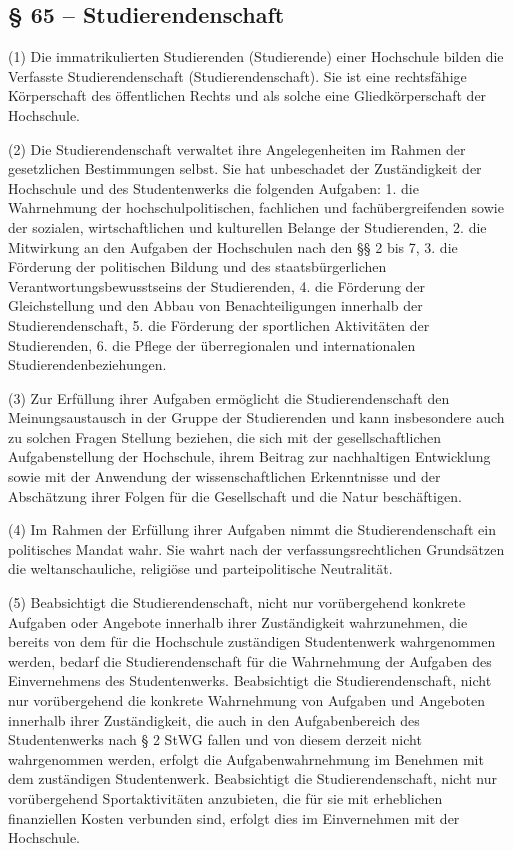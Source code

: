 \documentclass[
10pt,
a4paper,
twoside,								%
titlepage=false,							%
draft=false								%
]{scrartcl}
\begin{document}
\subsection{§ 65 – Studierendenschaft}

(1) Die immatrikulierten Studierenden (Studierende) einer Hochschule bilden die Verfasste Studierendenschaft (Studierendenschaft). Sie ist eine rechtsfähige Körperschaft des öffentlichen Rechts und als solche eine Gliedkörperschaft der Hochschule.

(2) Die Studierendenschaft verwaltet ihre Angelegenheiten im Rahmen der gesetzlichen Bestimmungen selbst. Sie hat unbeschadet der Zuständigkeit der Hochschule und des Studentenwerks die folgenden Aufgaben:
1. die Wahrnehmung der hochschulpolitischen, fachlichen und fachübergreifenden sowie der sozialen, wirtschaftlichen und kulturellen Belange der Studierenden,
2. die Mitwirkung an den Aufgaben der Hochschulen nach den §§ 2 bis 7,
3. die Förderung der politischen Bildung und des staatsbürgerlichen Verantwortungsbewusstseins der Studierenden,
4. die Förderung der Gleichstellung und den Abbau von Benachteiligungen innerhalb der Studierendenschaft,
5. die Förderung der sportlichen Aktivitäten der Studierenden,
6. die Pflege der überregionalen und internationalen Studierendenbeziehungen.

(3) Zur Erfüllung ihrer Aufgaben ermöglicht die Studierendenschaft den Meinungsaustausch in der Gruppe der Studierenden und kann insbesondere auch zu solchen Fragen Stellung beziehen, die sich mit der gesellschaftlichen Aufgabenstellung der Hochschule, ihrem Beitrag zur nachhaltigen Entwicklung sowie mit der Anwendung der wissenschaftlichen Erkenntnisse und der Abschätzung ihrer Folgen für die Gesellschaft und die Natur beschäftigen.

(4) Im Rahmen der Erfüllung ihrer Aufgaben nimmt die Studierendenschaft ein politisches Mandat wahr. Sie wahrt nach der verfassungsrechtlichen Grundsätzen die weltanschauliche, religiöse und parteipolitische Neutralität.

(5) Beabsichtigt die Studierendenschaft, nicht nur vorübergehend konkrete Aufgaben oder Angebote innerhalb ihrer Zuständigkeit wahrzunehmen, die bereits von dem für die Hochschule zuständigen Studentenwerk wahrgenommen werden, bedarf die Studierendenschaft für die Wahrnehmung der Aufgaben des Einvernehmens des Studentenwerks. Beabsichtigt die Studierendenschaft, nicht nur vorübergehend die konkrete Wahrnehmung von Aufgaben und Angeboten innerhalb ihrer Zuständigkeit, die auch in den Aufgabenbereich des Studentenwerks nach § 2 StWG fallen und von diesem derzeit nicht wahrgenommen werden, erfolgt die Aufgabenwahrnehmung im Benehmen mit dem zuständigen Studentenwerk. Beabsichtigt die Studierendenschaft, nicht nur vorübergehend Sportaktivitäten anzubieten, die für sie mit erheblichen finanziellen Kosten verbunden sind, erfolgt dies im Einvernehmen mit der Hochschule.
\end{document}
